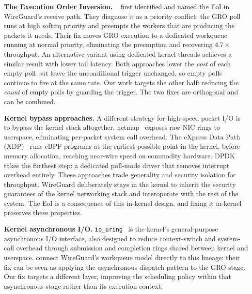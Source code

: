 \documentclass{article}
\begin{document}
\textbf{The Execution Order Inversion.}
\citeauthor{mounah2025}~\cite{mounah2025} first identified and named the EoI in
WireGuard's receive path. They diagnose it as a priority conflict: the GRO poll
runs at high softirq priority and preempts the workers that are producing the
packets it needs. Their fix moves GRO execution to a dedicated workqueue running
at normal priority, eliminating the preemption and recovering $4.7\times$
throughput. An alternative variant using dedicated kernel threads achieves a
similar result with lower tail latency. Both approaches lower the \emph{cost} of
each empty poll but leave the unconditional trigger unchanged, so empty polls
continue to fire at the same rate. Our work targets the other half: reducing the
\emph{count} of empty polls by guarding the trigger. The two fixes are
orthogonal and can be combined.

\textbf{Kernel bypass approaches.}
A different strategy for high-speed packet I/O is to bypass the kernel stack
altogether. netmap~\cite{rizzo2012netmap} exposes raw NIC rings to userspace,
eliminating per-packet system call overhead. The eXpress Data Path
(XDP)~\cite{hoiland2018xdp} runs eBPF programs at the earliest possible point
in the kernel, before memory allocation, reaching near-wire speed on commodity
hardware. DPDK takes the furthest step: a dedicated poll-mode driver that
removes interrupt overhead entirely. These approaches trade generality and
security isolation for throughput. WireGuard deliberately stays in the kernel to
inherit the security guarantees of the kernel networking stack and interoperate
with the rest of the system. The EoI is a consequence of this in-kernel design,
and fixing it in-kernel preserves these properties.

\textbf{Kernel asynchronous I/O.}
\texttt{io\_uring}~\cite{axboe2019} is the kernel's general-purpose
asynchronous I/O interface, also designed to reduce context-switch and
system-call overhead through submission and completion rings shared between
kernel and userspace. \citeauthor{mounah2025} connect WireGuard's workqueue
model directly to this lineage: their fix can be seen as applying the
asynchronous dispatch pattern to the GRO stage. Our fix targets a different
layer, improving the scheduling policy within that asynchronous stage rather
than its execution context.

\end{document}
